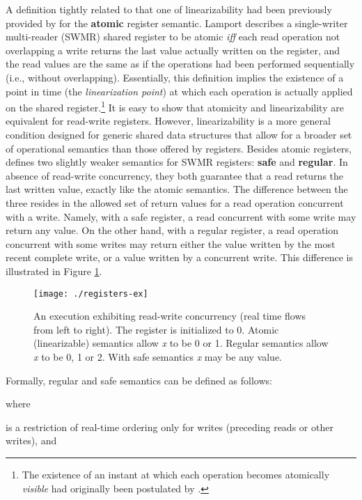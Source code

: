 \documentclass[letter, 11pt]{article}
\newcommand{\citeN}{\citet}
\begin{document}
A definition tightly related to that one of linearizability had been previously 
provided by \citeN{Lamport:86:vol2} for the \textbf{atomic} register semantic.
Lamport describes a single-writer multi-reader (SWMR) shared register to be atomic 
\emph{iff} each read operation not overlapping 
a write returns the last value actually written on the register, 
and the read values are the same as if the operations had been performed sequentially (i.e., without overlapping). Essentially, this definition implies the existence of a point in time 
(the \emph{linearization point}) at which each operation is actually applied on the shared register.\footnote{The existence of an instant 
at which each operation becomes atomically \emph{visible} had originally been postulated by \citeN{Lamport:83}.}
It is easy to show that 
atomicity and linearizability are equivalent for read-write registers.
However, linearizability is a more general condition designed 
for generic shared data structures that allow for a broader set of operational semantics 
than those offered by registers.
Besides atomic registers, \citeN{Lamport:86:vol2} defines  two slightly weaker semantics for SWMR registers: \textbf{safe} and \textbf{regular}.
In absence of read-write concurrency, they both guarantee that a read returns the last written value, 
exactly like the atomic semantics. The difference between the three resides in the allowed set of return values for a read operation 
concurrent with a write.
Namely, with a safe register, a read concurrent with some write may return any value. 
On the other hand, with a regular register, a read operation concurrent with some writes 
may return either the value written by the most recent complete write, 
or a value written by a concurrent write.
This difference is illustrated in Figure \ref{fig:reg-ex}.
\begin{figure}[h]
	\centering
	\texttt{[image: ./registers-ex]} 	\caption{An execution exhibiting read-write concurrency (real time flows from left to right). The register is initialized to 0.  
	Atomic (linearizable) semantics allow \emph{x} to be 0 or 1. 
	Regular semantics allow \emph{x} to be 0, 1 or 2. With safe semantics \emph{x} may be any value.}
	\label{fig:reg-ex}
\end{figure}

Formally, regular and safe semantics can be defined as follows:


where

is a restriction of real-time ordering only for writes (preceding reads or other writes), and 
\end{document}
